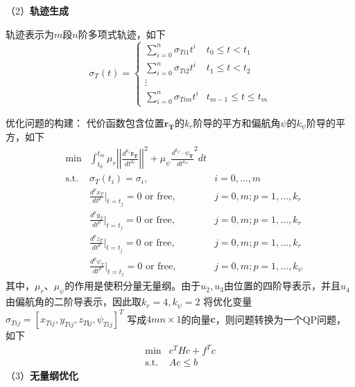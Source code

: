 （2）\textbf{轨迹生成}


轨迹表示为$m$段$n$阶多项式轨迹，如下
\begin{equation}
    \sigma_T(t)=\left\{\begin{array}{cc}\sum_{i=0}^n\sigma_{Ti1}t^i&t_0\leq t<t_1\\\sum_{i=0}^n\sigma_{Ti2}t^i&t_1\leq t<t_2\\\vdots\\\sum_{i=0}^n\sigma_{Tim}t^i&t_{m-1}\leq t\leq t_m\end{array}\right.
\end{equation}


优化问题的构建：
代价函数包含位置$\mathbf{r_T}$的$k_r$阶导的平方和偏航角$\psi$的$k_\psi$阶导的平方，如下
\begin{equation}
    \begin{aligned}\label{costfun}
        &\min&\int_{t_0}^{t_m}\mu_r\left|\left|\frac{d^{k_r}\mathbf{r_T}}{dt^{k_r}}\right|\right|^2+\mu_\psi\frac{d^{k_\psi}\cdot\psi_\mathbf{T}}{dt^{k_\psi}}^2dt&\\
        &\text{s.t.}&\sigma_T(t_i)=\sigma_i,&i=0,...,m\\
        & &\frac{d^px_T}{dt^p}|_{t=t_j}=0\text{ or free},&j=0,m; p=1,...,k_r\\
        & &\frac{d^py_T}{dt^p}|_{t=t_j}=0\text{ or free},&j=0,m; p=1,...,k_r\\
        & &\frac{d^pz_T}{dt^p}|_{t=t_j}=0\text{ or free},&j=0,m; p=1,...,k_r\\
        & &\frac{d^p\psi_T}{dt^p}|_{t=t_j}=0\text{ or free},&j=0,m; p=1,...,k_\psi
    \end{aligned}
\end{equation}
其中，$\mu_r$、$\mu_\psi$的作用是使积分量无量纲。由于$u_2,u_3$由位置的四阶导表示，并且$u_4$由偏航角的二阶导表示，因此取$k_r=4,k_\psi=2$
将优化变量$\sigma_{Tij}=[x_{Tij},y_{Tij},z_{T\boldsymbol{i}j},\psi_{Tij}]^T$
写成$4mn\times 1$的向量$\mathbf{c}$，则问题转换为一个QP问题，如下
\begin{equation}\label{qp}
    \begin{array}{cc}\min&c^THc+f^Tc\\\mathrm{s.t.}&Ac\leq b\end{array}
\end{equation}
（3）\textbf{无量纲优化}


